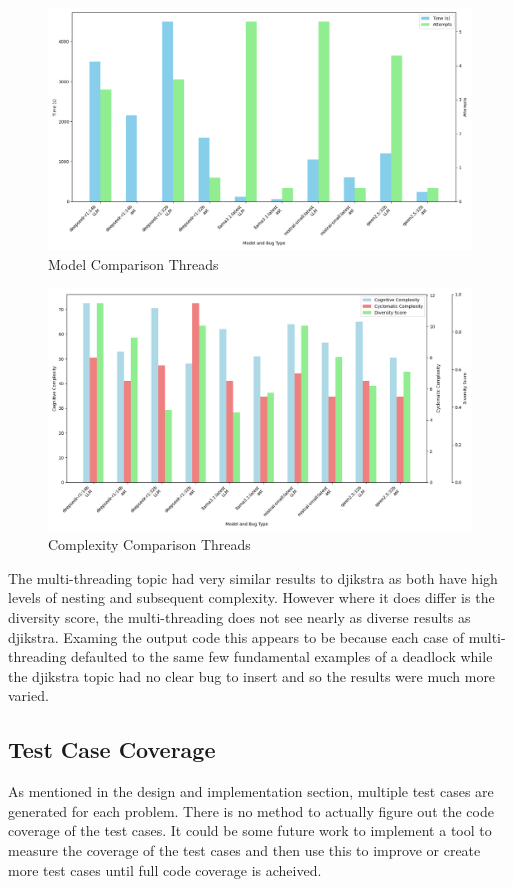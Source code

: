 \documentclass[12pt]{extarticle}
\begin{document}
\begin{figure}[h!]
\centering
\includegraphics[width=0.8\linewidth]{Images/Model_Comparison_Threads.png}
\caption{Model Comparison Threads}
\label{fig:Model_Comparison_Threads}
\end{figure}

\begin{figure}[h!]
\centering
\includegraphics[width=0.8\linewidth]{Images/Complexity_Comparison_Threads.png}
\caption{Complexity Comparison Threads}
\label{fig:Complexity_Comparison_Threads}
\end{figure}

The multi-threading topic had very similar results to djikstra as both have high levels of nesting and subsequent complexity. However where it does differ is the diversity score, the multi-threading does not see nearly as diverse results as djikstra. Examing the output code this appears to be because each case of multi-threading defaulted to the same few fundamental examples of a deadlock while the djikstra topic had no clear bug to insert and so the results were much more varied.

\subsection{Test Case Coverage}

As mentioned in the design and implementation section, multiple test cases are generated for each problem. There is no method to actually figure out the code coverage of the test cases. It could be some future work to implement a tool to measure the coverage of the test cases and then use this to improve or create more test cases until full code coverage is acheived. 
\end{document}
